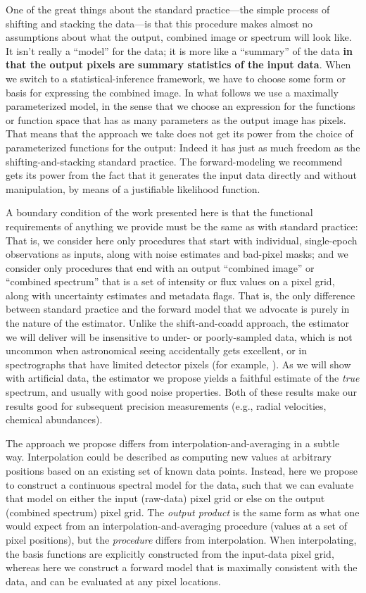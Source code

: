 \documentclass[modern, linenumbers]{aastex631}
\newcommand{\modified}[1]{\textcolor{Emerald}{\textbf{#1}}}
\begin{document}
One of the great things about the standard practice---the simple process of shifting and stacking the data---is that this procedure makes almost no assumptions about what the output, combined image or spectrum will look like.
It isn't really a ``model'' for the data; it is more like a ``summary'' of the data \modified{in that the output pixels are summary statistics of the input data}.
When we switch to a statistical-inference framework, we have to choose some form or basis for expressing the combined image.
In what follows we use a maximally parameterized model, in the sense that we choose an expression for the functions or function space that has as many parameters as the output image has pixels.
That means that the approach we take does not get its power from the choice of parameterized functions for the output:
Indeed it has just as much freedom as the shifting-and-stacking standard practice.
The forward-modeling we recommend gets its power from the fact that it generates the input data directly and without manipulation, by means of a justifiable likelihood function.

A boundary condition of the work presented here is that the functional requirements of anything we provide must be the same as with standard practice:
That is, we consider here only procedures that start with individual, single-epoch observations as inputs, along with noise estimates and bad-pixel masks; and we consider only procedures that end with an output ``combined image'' or ``combined spectrum'' that is a set of intensity or flux values on a pixel grid, along with uncertainty estimates and metadata flags.
That is, the only difference between standard practice and the forward model that we advocate is purely in the nature of the estimator.
Unlike the shift-and-coadd approach, the estimator we will deliver will be insensitive to under- or poorly-sampled data, which is not uncommon when astronomical seeing accidentally gets excellent, or in spectrographs that have limited detector pixels (for example, \citealt{apogeehardware}).
As we will show with artificial data, the estimator we propose yields a faithful estimate of the \emph{true} spectrum, and usually with good noise properties.
Both of these results make our results good for subsequent precision measurements (e.g., radial velocities, chemical abundances).

The approach we propose differs from interpolation-and-averaging in a subtle way.
Interpolation could be described as computing new values at arbitrary positions based on an existing set of known data points.
Instead, here we propose to construct a continuous spectral model for the data, such that we can evaluate that model on either the input (raw-data) pixel grid or else on the output (combined spectrum) pixel grid.
The \emph{output product} is the same form as what one would expect from an interpolation-and-averaging procedure (values at a set of pixel positions), but the \emph{procedure} differs from interpolation. When interpolating, the basis functions are explicitly constructed from the input-data pixel grid, whereas here we construct a forward model that is maximally consistent with the data, and can be evaluated at any pixel locations.
\end{document}
